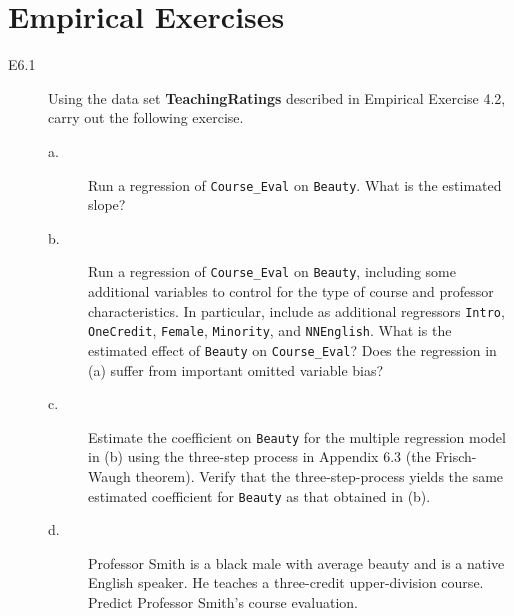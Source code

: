 \documentclass[a4paper,11pt]{article}
\begin{document}
\section*{Empirical Exercises}
\label{sec:orgfb1df83}
\begin{description}
\item[{E6.1}] Using the data set \textbf{TeachingRatings} described in Empirical
Exercise 4.2, carry out the following exercise.
\begin{description}
\item[{a.}] Run a regression of \texttt{Course\_Eval} on \texttt{Beauty}. What is the
estimated slope?
\item[{b.}] Run a regression of \texttt{Course\_Eval} on \texttt{Beauty}, including
some additional variables to control for the type of course
and professor characteristics. In particular, include as
additional regressors \texttt{Intro}, \texttt{OneCredit}, \texttt{Female},
\texttt{Minority}, and \texttt{NNEnglish}. What is the estimated effect of
\texttt{Beauty} on \texttt{Course\_Eval}? Does the regression in (a) suffer
from important omitted variable bias?
\item[{c.}] Estimate the coefficient on \texttt{Beauty} for the multiple
regression model in (b) using the three-step process in
Appendix 6.3 (the Frisch-Waugh theorem). Verify that the
three-step-process yields the same estimated coefficient for
\texttt{Beauty} as that obtained in (b).
\item[{d.}] Professor Smith is a black male with average beauty and is a
native English speaker. He teaches a three-credit
upper-division course. Predict Professor Smith's course
evaluation.
\end{description}
\end{description}
\end{document}
